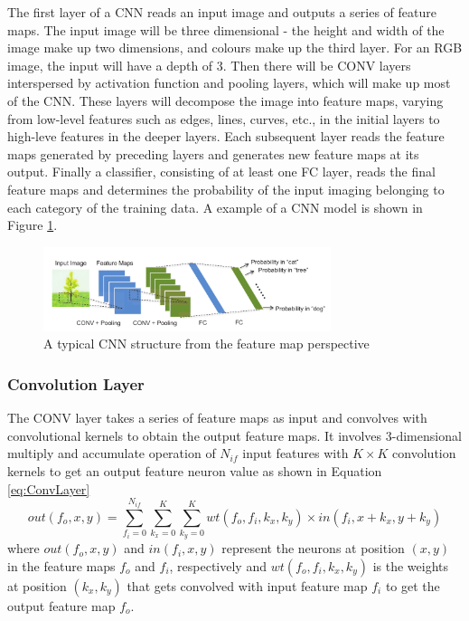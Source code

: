 \documentclass[12pt]{article}
\begin{document}
The first layer of a CNN reads an input image and outputs a series of feature maps. The input image will be three dimensional - the height and width of the image make up two dimensions, and colours make up the third layer. For an RGB image, the input will have a depth of 3. Then there will be CONV layers interspersed by activation function and pooling layers, which will make up most of the CNN. These layers will decompose the image into feature maps, varying from low-level features such as edges, lines, curves, etc., in the initial layers to high-leve features in the deeper layers\cite{fpgaCnnAccelerator}. Each subsequent layer reads the feature maps generated by preceding layers and generates new feature maps at its output. Finally a classifier, consisting of at least one FC layer, reads the final feature maps and determines the probability of the input imaging belonging to each category of the training data. A example of a CNN model is shown in Figure \ref{fig:typicalCNN}.
\begin{figure}

\centering
\includegraphics[width=0.75\textwidth]{../figures/typicalCnn}

  \caption{A typical CNN structure from the feature map perspective \cite{embeddedFpgaCnn} \label{fig:typicalCNN}}

\end{figure}

\subsubsection{Convolution Layer}
\label{sec:Background-CNN-Conv}

The CONV layer takes a series of feature maps as input and convolves with convolutional kernels to obtain the output feature maps. It involves 3-dimensional multiply and accumulate operation of $N_{if}$ input features with $K\times K$ convolution kernels to get an output feature neuron value as shown in Equation \ref{eq:ConvLayer}
\begin{equation}
out(f_o,x,y)=\sum^{N_{if}}_{f_i=0} \sum^{K}_{k_x=0} \sum^{K}_{k_y=0} wt(f_o,f_i,k_x,k_y)\times in(f_i,x+k_x,y+k_y)
\label{eq:ConvLayer}
\end{equation}
where $out(f_o,x,y)$ and $in(f_i,x,y)$ represent the neurons at position $(x,y)$ in the feature maps $f_o$ and $f_i$, respectively and $wt(f_o,f_i,k_x,k_y)$ is the weights at position $(k_x,k_y)$ that gets convolved with input feature map $f_i$ to get the output feature map $f_o$\cite{fpgaCnnAccelerator}.
\end{document}

